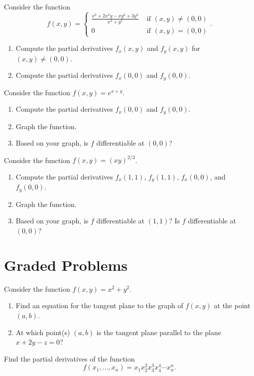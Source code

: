 \documentclass{ximera}
\begin{document}
\begin{problem}
Consider the function
\[
f(x,y) = \begin{cases}
\frac{x^3 + 2x^2y -xy^2 + 3y^3}{x^2+y^2} & \text{ if }(x,y)\neq (0,0)\\
0 & \text{ if }(x,y) = (0,0)
\end{cases}.
\]
\begin{enumerate}
\item Compute the partial derivatives $f_x(x,y)$ and $f_y(x,y)$ for $(x,y) \neq (0,0)$.
\item Compute the partial derivatives $f_x(0,0)$ and $f_y(0,0)$.
\end{enumerate}
\end{problem}

\begin{problem}
Consider the function $f(x,y) = e^{x+y}$.
\begin{enumerate}
\item Compute the partial derivatives $f_x(0,0)$ and $f_y(0,0)$.
\item Graph the function.
\item Based on your graph, is $f$ differentiable at $(0,0)$?
\end{enumerate}
\end{problem}

\begin{problem}
Consider the function $f(x,y) = (xy)^{2/3}$.
\begin{enumerate}
\item Compute the partial derivatives $f_x(1,1)$, $f_y(1,1)$, $f_x(0,0)$, and $f_y(0,0)$.
\item Graph the function.
\item Based on your graph, is $f$ differentiable at $(1,1)$? Is $f$ differentiable at $(0,0)$?
\end{enumerate}
\end{problem}



\section*{Graded Problems}

\begin{problem}
Consider the function $f(x,y) = x^2+y^2$.
\begin{enumerate}
\item Find an equation for the tangent plane to the graph of $f(x,y)$ at the point $(a,b)$.
\item At which point(s) $(a,b)$ is the tangent plane parallel to the plane $x+2y-z = 0$?
\end{enumerate}
\end{problem}

\begin{problem}
Find the partial derivatives of the function
\[
f(x_1,...,x_n) = x_1x_2^2x_3^3x_4^4\cdots x_n^n.
\]
\end{problem}
\end{document}
